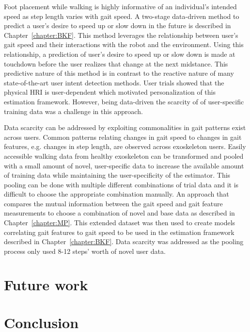 Foot placement while walking is highly informative of an individual's intended speed as step length varies with gait speed. A two-stage data-driven method to predict a user's desire to speed up or slow down in the future is described in Chapter~\ref{chapter:BKF}. This method leverages the relationship between user's gait speed and their interactions with the robot and the environment. Using this relationship, a prediction of user's desire to speed up or slow down is made at touchdown before the user realizes that change at the next midstance. This predictive nature of this method is in contrast to the reactive nature of many state-of-the-art user intent detection methods. User trials showed that the physical HRI is user-dependent which motivated personalization of this estimation framework. However, being data-driven the scarcity of of user-specific training data was a challenge in this approach. 

Data scarcity can be addressed by exploiting commonalities in gait patterns exist across users. Common patterns relating changes in gait speed to changes in gait features, e.g. changes in step length, are observed across exoskeleton users. Easily accessible walking data from healthy exoskeleton can be transformed and pooled with a small amount of novel, user-specific data to increase the available amount of training data while maintaining the user-specificity of the estimator. This pooling can be done with multiple different combinations of trial data and it is difficult to choose the appropriate combination manually. An approach that compares the mutual information between the gait speed and gait feature measurements to choose a combination of novel and base data as described in Chapter~\ref{chapter:MP}. This extended dataset was then used to create models correlating gait features to gait speed to be used in the estimation framework described in Chapter~\ref{chapter:BKF}. Data scarcity was addressed as the pooling process only used 8-12 steps' worth of novel user data.

\section{Future work}



\section{Conclusion}